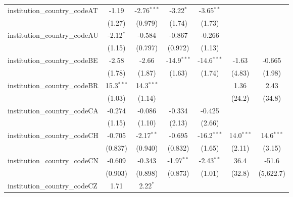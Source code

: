 \begin{tabular}{lcccccc}
   institution\_country\_codeAT          & -1.19         & -2.76$^{***}$ & -3.22$^{*}$   & -3.65$^{**}$  &               &   \\   
                                         & (1.27)        & (0.979)       & (1.74)        & (1.73)        &               &   \\   
   institution\_country\_codeAU          & -2.12$^{*}$   & -0.584        & -0.867        & -0.266        &               &   \\   
                                         & (1.15)        & (0.797)       & (0.972)       & (1.13)        &               &   \\   
   institution\_country\_codeBE          & -2.58         & -2.66         & -14.9$^{***}$ & -14.6$^{***}$ & -1.63         & -0.665\\   
                                         & (1.78)        & (1.87)        & (1.63)        & (1.74)        & (4.83)        & (1.98)\\   
   institution\_country\_codeBR          & 15.3$^{***}$  & 14.3$^{***}$  &               &               & 1.36          & 2.43\\   
                                         & (1.03)        & (1.14)        &               &               & (24.2)        & (34.8)\\   
   institution\_country\_codeCA          & -0.274        & -0.086        & -0.334        & -0.425        &               &   \\   
                                         & (1.15)        & (1.10)        & (2.13)        & (2.66)        &               &   \\   
   institution\_country\_codeCH          & -0.705        & -2.17$^{**}$  & -0.695        & -16.2$^{***}$ & 14.0$^{***}$  & 14.6$^{***}$\\   
                                         & (0.837)       & (0.940)       & (0.832)       & (1.65)        & (2.11)        & (3.15)\\   
   institution\_country\_codeCN          & -0.609        & -0.343        & -1.97$^{**}$  & -2.43$^{**}$  & 36.4          & -51.6\\   
                                         & (0.903)       & (0.898)       & (0.873)       & (1.01)        & (32.8)        & (5,622.7)\\   
   institution\_country\_codeCZ          & 1.71          & 2.22$^{*}$    &               &               &               &   \\   

\end{tabular}
